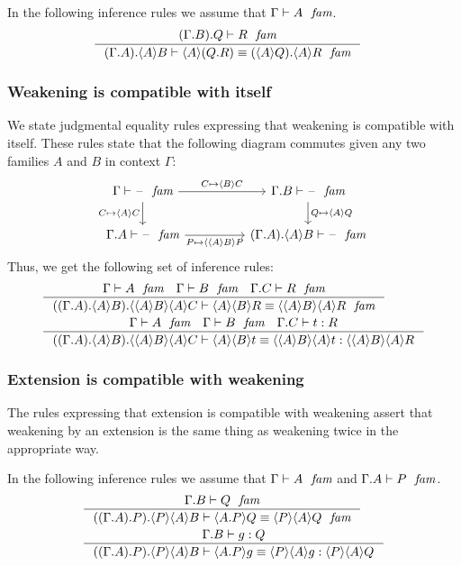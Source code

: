 In the following inference rules we assume that $\jfam{\Gamma}{A}$.
\begin{align}
& \inference
  {\jfam{{{\Gamma}{B}}{Q}}{R}}
  {\jfameq
    {\ctxext{{\Gamma}{A}}{\ctxwk{A}{B}}}
    {\ctxwk{A}{\ctxext{Q}{R}}}
    {\ctxext{\ctxwk{A}{Q}}{\ctxwk{A}{R}}}}
\end{align}

\subsubsection{Weakening is compatible with itself}\label{comp-ww}
We state judgmental equality rules expressing
that weakening is compatible with itself. These rules state that the following
diagram commutes given any two families $A$ and $B$ in context $\Gamma$:
\begin{equation*}
\begin{tikzcd}[column sep=huge]
\jfam{\Gamma}{\blank} \ar{r}{C\mapsto\ctxwk{B}{C}} \ar{d}[swap]{C\mapsto\ctxwk{A}{C}} & \jfam{{\Gamma}{B}}{\blank} \ar{d}{Q\mapsto\ctxwk{A}{Q}}\\
\jfam{{\Gamma}{A}}{\blank} \ar{r}[swap]{P\mapsto\ctxwk{{A}{B}}{P}} & \jfam{{{\Gamma}{A}}{\ctxwk{A}{B}}}{\blank}
\end{tikzcd}
\end{equation*}
Thus, we get the following set of inference rules:
\begin{align}
& \inference
  {\jfam{\Gamma}{A}
   \jfam{\Gamma}{B}
   \jfam{{\Gamma}{C}}{R}}
  {\jfameq{{{{\Gamma}{A}}{\ctxwk{A}{B}}}{\ctxwk{{A}{B}}{{A}{C}}}}
    {\ctxwk{A}{{B}{R}}}
    {\ctxwk{{A}{B}}{{A}{R}}}}\label{comp-ww-f}\\
& \inference
  {\jfam{\Gamma}{A}
   \jfam{\Gamma}{B}
   \jterm{{\Gamma}{C}}{R}{t}}
  {\jtermeq{{{{\Gamma}{A}}{\ctxwk{A}{B}}}{\ctxwk{{A}{B}}{{A}{C}}}}
    {\ctxwk{{A}{B}}{{A}{R}}}{\ctxwk{A}{{B}{t}}}{\ctxwk{{A}{B}}{{A}{t}}}}
\label{comp-ww-t}
\end{align}

\subsubsection{Extension is compatible with weakening}\label{comp-ew}
The rules expressing that extension is compatible with weakening assert that
weakening by an extension is the same thing as weakening twice in the
appropriate way.

In the following inference rules we assume that
$\jfam{\Gamma}{A}$ and $\jfam{{\Gamma}{A}}{P}$. 
\begin{align}
& \inference
  {\jfam{{\Gamma}{B}}{Q}}
  {\jfameq{{{{\Gamma}{A}}{P}}{\ctxwk{P}{{A}{B}}}}{\ctxwk{\ctxext{A}{P}}{Q}}{\ctxwk{P}{{A}{Q}}}}
  \label{comp-ew-f}\\
& \inference
  {\jterm{{\Gamma}{B}}{Q}{g}}
  {\jtermeq{{{{\Gamma}{A}}{P}}{\ctxwk{P}{{A}{B}}}}{\ctxwk{P}{{A}{Q}}}{\ctxwk{\ctxext{A}{P}}{g}}{\ctxwk{P}{{A}{g}}}} 
  \label{comp-ew-t}
\end{align}

